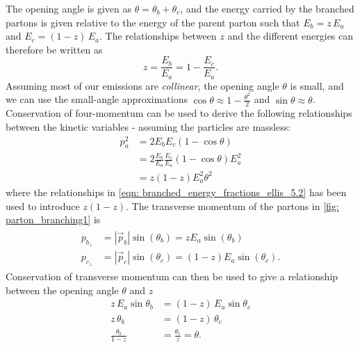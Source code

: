 \documentclass[main.tex]{subfiles}
\begin{document}
The opening angle is given as \(\theta = \theta_b+\theta_c\), and the energy carried by the branched partons is given relative to the energy of the parent parton such that \(E_b=z\,E_a\) and \(E_c=(1-z)\,E_a\). The relationships between \(z\) and the different energies can therefore be written as
\begin{equation}\label{eqn: branched_energy_fractions_ellis_5.2}
    z = \frac{E_b}{E_a} = 1- \frac{E_c}{E_a}.
\end{equation}
Assuming most of our emissions are \emph{collinear}, the opening angle \(\theta\) is small, and we can use the small-angle approximations \(\cos \theta \approx 1- \frac{\theta^2}{2}\) and \(\sin \theta \approx \theta\). Conservation of four-momentum can be used to derive the following relationships between the kinetic variables - assuming the particles are massless:
\begin{align}
    p_a^2 &= 2 E_b E_c (1-\cos \theta) \nonumber\\ 
    &= 2 \frac{E_b}{E_a} \frac{E_c}{E_a} (1-\cos \theta) E_a^2 \nonumber\\
    &= z (1-z) E_a^2 \theta^2
\end{align}
where the relationships in \autoref{eqn: branched_energy_fractions_ellis_5.2} has been used to introduce \(z(1-z)\). The transverse momentum of the partons in \autoref{fig: parton_branching1} is
\begin{align}
    \begin{split}
        p_{b_\perp} &= |\vec p_b| \sin(\theta_b) = zE_a \sin(\theta_b) \\
        p_{c_\perp} &= |\vec p_c| \sin(\theta_c) = (1-z)E_a \sin(\theta_c).
    \end{split}
\end{align}
Conservation of transverse momentum can then be used to give a relationship between the opening angle \(\theta\) and \(z\)
\begin{align}\label{eqn: theta_momentum_conv_ellis_5.4}
    z\, E_a \sin \theta_b &= (1-z)\, E_a \sin \theta_c \nonumber \\
    z\, \theta_b &= (1-z)\, \theta_c  \nonumber \\
    \frac{\theta_b}{1-z} &= \frac{\theta_c}{z} = \theta.
\end{align}
\end{document}
